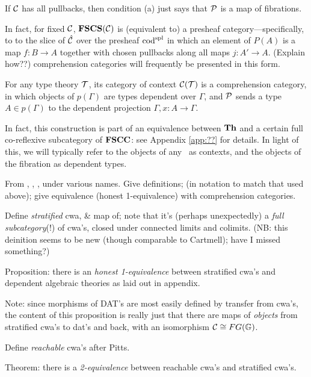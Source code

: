 If $\mathcal{C}$ has all pullbacks, then condition (a) just says that $\mathcal{P}$ is a map of fibrations.
 
In fact, for fixed $\mathcal{C}$, $\mathbf{FSCS}(\mathcal{C})$ is (equivalent to) a presheaf category---specifically, to to the slice of $\hat{\mathcal{C}}$ over the presheaf $\mathrm{cod}^{\mathrm{spl}}$ in which an element of $P(A)$ is a map $f : B \to A$ together with chosen pullbacks along all maps $j : A' \to A$.  (Explain how??)  comprehension categories will frequently be presented in this form.


\begin{example}For any type theory $\mathcal{T}$, its category of context $\mathcal{C}(\mathcal{T})$ is a comprehension category, in which objects of $p(\Gamma)$ are types dependent over $\Gamma$, and $\mathcal{P}$ sends a type $A \in p(\Gamma)$ to the dependent projection $\Gamma, x : A \to \Gamma$.
\end{example}

In fact, this construction is part of an equivalence between $\mathbf{Th}$ and a certain full co-reflexive subcategory of $\mathbf{FSCC}$: see Appendix \ref{app:??} for details.  In light of this, we will typically refer to the objects of any \fscc\ as contexts, and the objects of the fibration as dependent types.


From \cite{pitts:categorical-logic}, \cite{hoffman:syntax-and-semantics}, \cite{dybjer:internal-type-theory}, under various names.  Give definitions; (in notation to match that used above); give equivalence (honest 1-equivalence) with comprehension categories.


Define \emph{stratified} cwa, \& map of; note that it's (perhaps unexpectedly) a \emph{full subcategory}(!) of cwa's, closed under connected limits and colimits. (NB: this deinition seems to be new (though comparable to Cartmell); have I missed something?)

Proposition: there is an \emph{honest 1-equivalence} between stratified cwa's and dependent algebraic theories as laid out in appendix.

Note: since morphisms of DAT's are most easily defined by transfer from cwa's, the content of this proposition is really just that there are maps of \emph{objects} from stratified cwa's to dat's and back, with an isomorphism $\mathcal{C} \cong FG(\mathbb{G})$.

Define \emph{reachable} cwa's after Pitts.

Theorem: there is a \emph{2-equivalence} between reachable cwa's and stratified cwa's.

